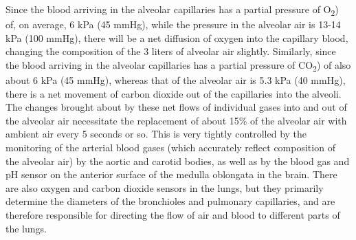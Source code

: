 Since the blood arriving in the alveolar capillaries has a partial pressure of O\textsubscript{2}) of, on average, 6 kPa (45 mmHg), while the pressure in the alveolar air is 13-14 kPa (100 mmHg), there will be a net diffusion of oxygen into the capillary blood, changing the composition of the 3 liters of alveolar air slightly. Similarly, since the blood arriving in the alveolar capillaries has a partial pressure of CO\textsubscript{2}) of also about 6 kPa (45 mmHg), whereas that of the alveolar air is 5.3 kPa (40 mmHg), there is a net movement of carbon dioxide out of the capillaries into the alveoli. The changes brought about by these net flows of individual gases into and out of the alveolar air necessitate the replacement of about 15\% of the alveolar air with ambient air every 5 seconds or so. This is very tightly controlled by the monitoring of the arterial blood gases (which accurately reflect composition of the alveolar air) by the aortic and carotid bodies, as well as by the blood gas and pH sensor on the anterior surface of the medulla oblongata in the brain. There are also oxygen and carbon dioxide sensors in the lungs, but they primarily determine the diameters of the bronchioles and pulmonary capillaries, and are therefore responsible for directing the flow of air and blood to different parts of the lungs.



